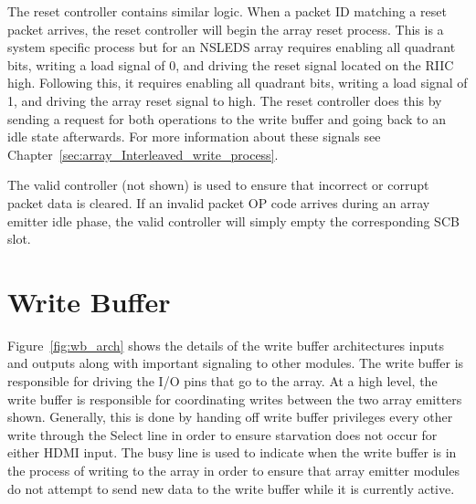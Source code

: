     The reset controller contains similar logic. When a packet ID matching a reset packet arrives, the reset controller will begin the array reset process. This is a system specific process but for an NSLEDS array requires enabling all quadrant bits, writing a load signal of 0, and driving the reset signal located on the RIIC high. Following this, it requires enabling all quadrant bits, writing a load signal of 1, and driving the array reset signal to high. The reset controller does this by sending a request for both operations to the write buffer and going back to an idle state afterwards. For more information about these signals see Chapter~\ref{sec:array_Interleaved_write_process}.

    The valid controller (not shown) is used to ensure that incorrect or corrupt packet data is cleared. If an invalid packet OP code arrives during an array emitter idle phase, the valid controller will simply empty the corresponding SCB slot.

\section{Write Buffer}

    Figure~\ref{fig:wb_arch} shows the details of the write buffer architectures inputs and outputs along with important signaling to other modules. The write buffer is responsible for driving the I/O pins that go to the array. At a high level, the write buffer is responsible for coordinating writes between the two array emitters shown. Generally, this is done by handing off write buffer privileges every other write through the Select line in order to ensure starvation does not occur for either HDMI input. The busy line is used to indicate when the write buffer is in the process of writing to the array in order to ensure that array emitter modules do not attempt to send new data to the write buffer while it is currently active.

